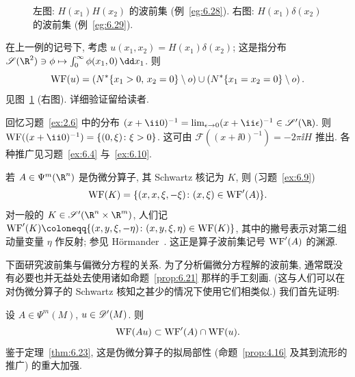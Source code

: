 \begin{figure}[htbp]
\centering
\drawFigSixTwo
\caption{左图: $H(x_1)H(x_2)$ 的波前集 (例~\ref{eg:6.28}). 右图: $H(x_1)\delta(x_2)$ 的波前集 (例~\ref{eg:6.29}).}
\label{fig:6.2}
\end{figure}

\begin{example}[截断 $\delta$-分布]\label{eg:6.29}
在上一例的记号下, 考虑 $u(x_1, x_2) = H(x_1)\delta(x_2)$; 这是指分布
$\mathscr{S}(\R^2) \ni \phi \mapsto \int_0^\infty \phi(x_1, 0) \,\dd x_1$. 则
\begin{equation}\label{eq:6.42}
    \operatorname{WF}(u) = \left( N^* \{x_1 > 0, \, x_2 = 0\} \setminus o \right) \cup \left( N^* \{x_1 = x_2 = 0\} \setminus o \right).
\end{equation}
见图~\ref{fig:6.2} (右图). 详细验证留给读者.
\end{example}

\begin{example}[$+ \ii 0$ 型分布]\label{eg:6.30}
回忆习题~\ref{ex:2.6} 中的分布 $(x + \ii 0)^{-1} = \lim_{\epsilon \to 0} (x + \ii \epsilon)^{-1} \in \mathscr{S}'(\R)$. 则 $\WF((x + \ii 0)^{-1}) = \{(0, \xi) \colon \xi > 0\}$. 这可由 $\mathcal{F}((x + \ii 0)^{-1}) = -2\pi \ii H$ 推出. 各种推广见习题~\ref{ex:6.4} 与~\ref{ex:6.10}.
\end{example}

\begin{example}\label{eg:6.31}
若 $A \in \Psi^m(\R^n)$ 是伪微分算子, 其 Schwartz 核记为 $K$, 则 (习题~\ref{ex:6.9})
\begin{equation}\label{eq:6.43}
    \operatorname{WF}(K) = \{(x, x, \xi, -\xi) \colon (x, \xi) \in \operatorname{WF}'(A)\}.
\end{equation}
对一般的 $K \in \mathscr{S}'(\R^n \times \R^m)$, 人们记 $\WF'(K) \defeq \{(x, y, \xi, -\eta) \colon (x, y, \xi, \eta) \in \WF(K)\}$, 其中的撇号表示对第二组动量变量 $\eta$ 作反射; 参见 Hörmander~\cite[定理 2.5.14]{Hor71a}. 这正是算子波前集记号 $\operatorname{WF}'(A)$ 的渊源.
\end{example}

下面研究波前集与偏微分方程的关系. 为了分析偏微分方程解的波前集, 通常既没有必要也并无益处去使用诸如命题~\ref{prop:6.21} 那样的手工刻画. (这与人们可以在对伪微分算子的 Schwartz 核知之甚少的情况下使用它们相类似.) 我们首先证明:

\begin{proposition}[伪微分算子的微局部性]\label{prop:6.32}
设 $A \in \Psi^m(M)$, $u \in \mathscr{D}'(M)$. 则
\begin{equation}\label{eq:6.44}
    \operatorname{WF}(A u) \subset \operatorname{WF}'(A) \cap \operatorname{WF}(u).
\end{equation}
鉴于定理~\ref{thm:6.23}, 这是伪微分算子的拟局部性 (命题~\ref{prop:4.16} 及其到流形的推广) 的重大加强.
\end{proposition}


